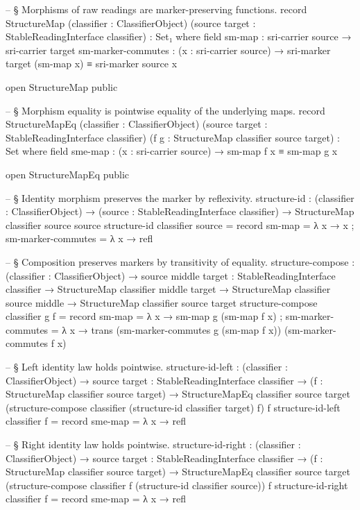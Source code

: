 \documentclass[11pt]{article}
\begin{document}
\begin{code}
-- § Morphisms of raw readings are marker-preserving functions.
record StructureMap (classifier : ClassifierObject)
                    (source target : StableReadingInterface classifier) : Set₁ where
  field
    sm-map             : sri-carrier source → sri-carrier target
    sm-marker-commutes : (x : sri-carrier source) →
                         sri-marker target (sm-map x) ≡ sri-marker source x

open StructureMap public

-- § Morphism equality is pointwise equality of the underlying maps.
record StructureMapEq (classifier : ClassifierObject)
                      (source target : StableReadingInterface classifier)
                      (f g : StructureMap classifier source target) : Set where
  field
    sme-map : (x : sri-carrier source) → sm-map f x ≡ sm-map g x

open StructureMapEq public

-- § Identity morphism preserves the marker by reflexivity.
structure-id :
  (classifier : ClassifierObject) →
  (source : StableReadingInterface classifier) → StructureMap classifier source source
structure-id classifier source = record
  { sm-map             = λ x → x
  ; sm-marker-commutes = λ x → refl
  }

-- § Composition preserves markers by transitivity of equality.
structure-compose :
  (classifier : ClassifierObject) →
  {source middle target : StableReadingInterface classifier} →
  StructureMap classifier middle target →
  StructureMap classifier source middle →
  StructureMap classifier source target
structure-compose classifier g f = record
  { sm-map = λ x → sm-map g (sm-map f x)
  ; sm-marker-commutes = λ x →
      trans (sm-marker-commutes g (sm-map f x)) (sm-marker-commutes f x)
  }

-- § Left identity law holds pointwise.
structure-id-left :
  (classifier : ClassifierObject) →
  {source target : StableReadingInterface classifier} →
  (f : StructureMap classifier source target) →
  StructureMapEq classifier source target
    (structure-compose classifier (structure-id classifier target) f) f
structure-id-left classifier f = record { sme-map = λ x → refl }

-- § Right identity law holds pointwise.
structure-id-right :
  (classifier : ClassifierObject) →
  {source target : StableReadingInterface classifier} →
  (f : StructureMap classifier source target) →
  StructureMapEq classifier source target
    (structure-compose classifier f (structure-id classifier source)) f
structure-id-right classifier f = record { sme-map = λ x → refl }


\end{code}
\end{document}
